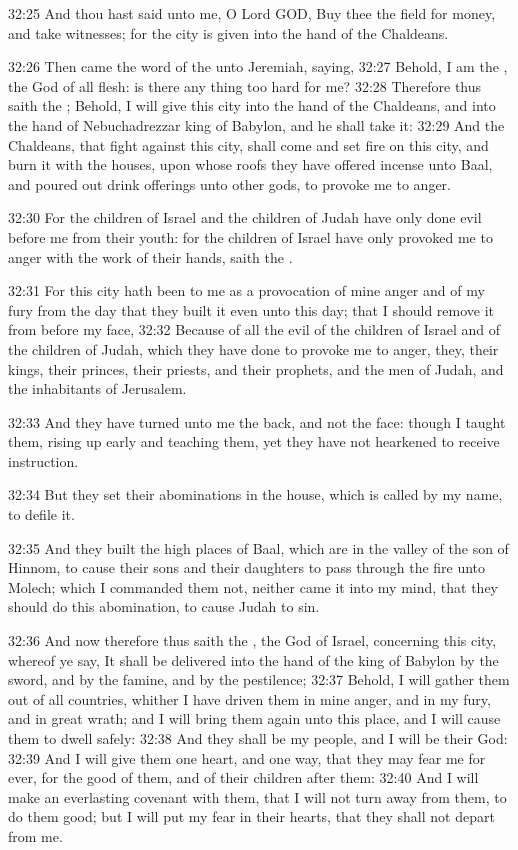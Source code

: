 32:25 And thou hast said unto me, O Lord GOD, Buy thee the field for
money, and take witnesses; for the city is given into the hand of the
Chaldeans.

32:26 Then came the word of the \LORD unto Jeremiah, saying, 32:27
Behold, I am the \LORD, the God of all flesh: is there any thing too
hard for me?  32:28 Therefore thus saith the \LORD; Behold, I will give
this city into the hand of the Chaldeans, and into the hand of
Nebuchadrezzar king of Babylon, and he shall take it: 32:29 And the
Chaldeans, that fight against this city, shall come and set fire on
this city, and burn it with the houses, upon whose roofs they have
offered incense unto Baal, and poured out drink offerings unto other
gods, to provoke me to anger.

32:30 For the children of Israel and the children of Judah have only
done evil before me from their youth: for the children of Israel have
only provoked me to anger with the work of their hands, saith the
\LORD.

32:31 For this city hath been to me as a provocation of mine anger and
of my fury from the day that they built it even unto this day; that I
should remove it from before my face, 32:32 Because of all the evil of
the children of Israel and of the children of Judah, which they have
done to provoke me to anger, they, their kings, their princes, their
priests, and their prophets, and the men of Judah, and the inhabitants
of Jerusalem.

32:33 And they have turned unto me the back, and not the face: though
I taught them, rising up early and teaching them, yet they have not
hearkened to receive instruction.

32:34 But they set their abominations in the house, which is called by
my name, to defile it.

32:35 And they built the high places of Baal, which are in the valley
of the son of Hinnom, to cause their sons and their daughters to pass
through the fire unto Molech; which I commanded them not, neither came
it into my mind, that they should do this abomination, to cause Judah
to sin.

32:36 And now therefore thus saith the \LORD, the God of Israel,
concerning this city, whereof ye say, It shall be delivered into the
hand of the king of Babylon by the sword, and by the famine, and by
the pestilence; 32:37 Behold, I will gather them out of all countries,
whither I have driven them in mine anger, and in my fury, and in great
wrath; and I will bring them again unto this place, and I will cause
them to dwell safely: 32:38 And they shall be my people, and I will be
their God: 32:39 And I will give them one heart, and one way, that
they may fear me for ever, for the good of them, and of their children
after them: 32:40 And I will make an everlasting covenant with them,
that I will not turn away from them, to do them good; but I will put
my fear in their hearts, that they shall not depart from me.

